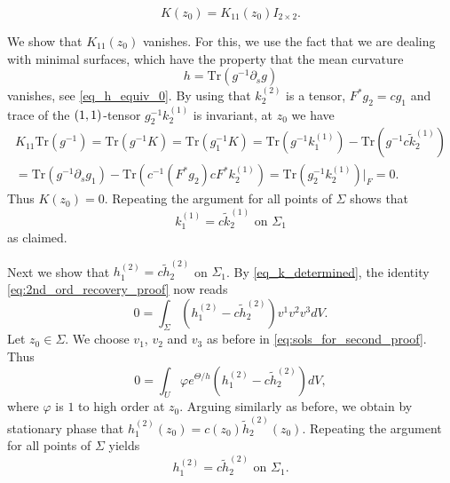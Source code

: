 \documentclass[12pt]{amsart}
\def\p{\partial}
\theoremstyle{definition}
\theoremstyle{remark}
\newcommand{\tr}{\text{Tr}}
\newcommand{\s}{\hspace{0.5pt}}
\begin{document}
\[
 K(z_0)=K_{11}(z_0)I_{2\times 2}.    
\]
% 
% 

We show that $K_{11}(z_0)$ vanishes. For this, we use the fact that we are dealing with minimal surfaces, which have the property that the mean curvature
\[
 h=\tr(g^{-1}\p_sg)
\]
vanishes, see \eqref{eq_h_equiv_0}. By using that $k_2^{(2)}$ is a tensor, $F^*g_2=cg_1$ and trace of the $(1,1)\s $-tensor $g_2^{-1}k_2^{(1)}$ is invariant, at $z_0$ we have 
\begin{multline*}
 K_{11} \tr(g^{-1})=\tr(g^{-1}K)=\tr(g_1^{-1}K)=\tr(g^{-1}k_1^{(1)})-\tr(g^{-1}c\tilde k_2^{(1)}) \\ 
 =\tr(g^{-1}\p_sg_1)-\tr(c^{-1}(F^*g_2)cF^* k_2^{(1)}) = \tr(g_2^{-1}k_2^{(1)})|_F=0.
\end{multline*}
Thus $K(z_0)=0$. Repeating the argument for all points of $\Sigma$ shows that
\begin{equation}\label{eq_k_determined}
 k_1^{(1)}= c\tilde k_2^{(1)} \text{ on } \Sigma_1
\end{equation}
as claimed. 

Next we show that $h_1^{(2)}=c\tilde h_2^{(2)}$  on  $\Sigma_1$. 
By \eqref{eq_k_determined}, the identity \eqref{eq:2nd_ord_recovery_proof} now reads
\[
  0=\int_{\Sigma} (h^{(2)}_1-c\tilde h^{(2)}_2)v^1v^2v^3dV.
\]
Let $z_0\in \Sigma$. We choose $v_1$, $v_2$ and $v_3$ as before in \eqref{eq:sols_for_second_proof}. Thus
\[
 0=\int_{U} \varphi e^{\Theta/h} (h^{(2)}_1-c\tilde h^{(2)}_2)dV,
\]
where $\varphi$ is $1$ to high order at $z_0$. Arguing similarly as before, we obtain by stationary phase \cite[Theorem 7.7.5]{hormander2015analysis} that
 $h^{(2)}_1(z_0)=c(z_0)\tilde h^{(2)}_2(z_0)$. 
Repeating the argument for all points of $\Sigma$ yields
\[
 h^{(2)}_1= c\tilde h^{(2)}_2 \text{ on } \Sigma_1.
\]
\end{document}

